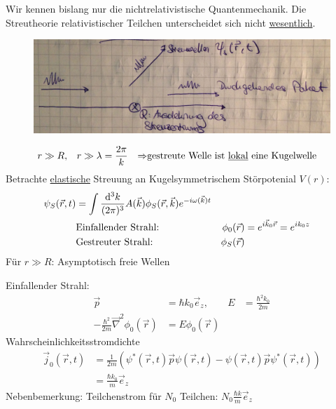 	Wir kennen bislang nur die nichtrelativistische Quantenmechanik. Die Streutheorie relativistischer Teilchen unterscheidet sich nicht \underline{wesentlich}.
	
	\begin{figure} [h]
		\begin{center}
			\includegraphics[width=12cm]{Stat_Streuproblem_Wirkungsquerschnitt6}
		\end{center}
	\end{figure}
		\begin{align*}
			r &\gg R ,& r &\gg \lambda = \frac{2 \pi}{k} &\Rightarrow 
			&\text{gestreute Welle ist \underline{lokal} eine Kugelwelle} 
		\end{align*}
	Betrachte \underline{elastische} Streuung an Kugelsymmetrischem Störpotenial $V(r)$:
		\begin{align*}
			\psi_S (\vec{r}, t) &= 
			\int \frac{\mathrm{d}^3 k}{(2 \pi)^3} A(\vec{k}) \phi_S (\vec{r}, \vec{k})
			e^{-i \omega (\vec{k}) t} \\
			&\text{Einfallender Strahl:} & \phi_0 (\vec{r}) &= e^{i \vec{k}_0 \vec{r}} = e^{i k_0 z}\\
			&\text{Gestreuter Strahl:} & \phi_S (\vec{r}) 
		\end{align*}
	Für $r \gg R$: Asymptotisch freie Wellen
	
	Einfallender Strahl:
		\begin{align*}
			\vec{p} &= \hbar k_0 \vec{e}_z ,& E &= \frac{\hbar^2 k_0}{2 m}\\
			-\frac{\hbar^2}{2 m} \vec{\nabla}^2 \phi_0 (\vec{r}) &= E \phi_0 (\vec{r})
		\end{align*}
	Wahrscheinlichkeitsstromdichte
		\begin{align*}
			\vec{j}_0 (\vec{r}, t) &=
			\frac{1}{2 m} 
			\left(\psi^* (\vec{r} , t) \vec{p} \psi (\vec{r}, t) - \psi (\vec{r}, t) \vec{p} \psi^* (\vec{r}, t)
			\right) \\
			&= \frac{\hbar k_0}{m} \vec{e}_z
		\end{align*}
	Nebenbemerkung: Teilchenstrom für $N_0$ Teilchen: $N_0 \frac{\hbar k}{m} \vec{e}_z$
	
